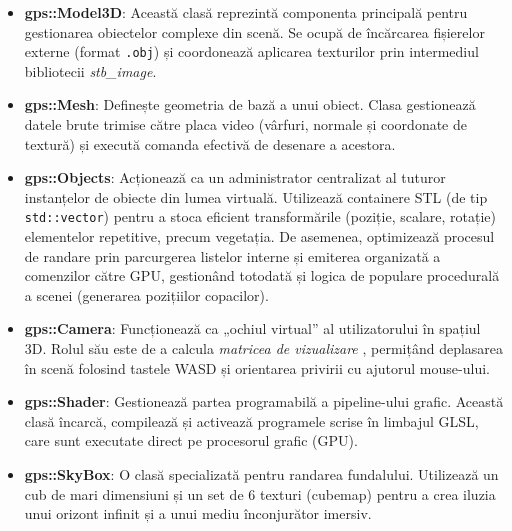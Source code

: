 \documentclass[11pt,a4paper]{article}
\begin{document}
\begin{itemize}
    \item \textbf{gps::Model3D}: Această clasă reprezintă componenta principală pentru gestionarea obiectelor complexe din scenă. Se ocupă de încărcarea fișierelor externe (format \texttt{.obj}) și coordonează aplicarea texturilor prin intermediul bibliotecii \textit{stb\_image}.
    
    \item \textbf{gps::Mesh}: Definește geometria de bază a unui obiect. Clasa gestionează datele brute trimise către placa video (vârfuri, normale și coordonate de textură) și execută comanda efectivă de desenare a acestora.
    
    \item \textbf{gps::Objects}: Acționează ca un administrator centralizat al tuturor instanțelor de obiecte din lumea virtuală. Utilizează containere STL (de tip \texttt{std::vector}) pentru a stoca eficient transformările (poziție, scalare, rotație) elementelor repetitive, precum vegetația. De asemenea, optimizează procesul de randare prin parcurgerea listelor interne și emiterea organizată a comenzilor către GPU, gestionând totodată și logica de populare procedurală a scenei (generarea pozițiilor copacilor).
    
    \item \textbf{gps::Camera}: Funcționează ca „ochiul virtual” al utilizatorului în spațiul 3D. Rolul său este de a calcula \textit{matricea de vizualizare} , permițând deplasarea în scenă folosind tastele WASD și orientarea privirii cu ajutorul mouse-ului.
    
    \item \textbf{gps::Shader}: Gestionează partea programabilă a pipeline-ului grafic. Această clasă încarcă, compilează și activează programele scrise în limbajul GLSL, care sunt executate direct pe procesorul grafic (GPU).
    
    \item \textbf{gps::SkyBox}: O clasă specializată pentru randarea fundalului. Utilizează un cub de mari dimensiuni și un set de 6 texturi (cubemap) pentru a crea iluzia unui orizont infinit și a unui mediu înconjurător imersiv.
\end{itemize}

\end{document}
